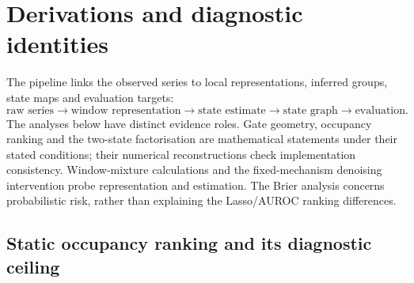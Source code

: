 \documentclass[11pt]{article}
\begin{document}
\begin{table}[!htbp]
\centering
\caption{Protocol check. The gate-stress row is deliberately given the wrong
candidate count.}
\label{tab:knownk}
\resizebox{\linewidth}{!}{}
\end{table}

\FloatBarrier
\section{Derivations and diagnostic identities}
\label{supp:derivations}

\label{sec:mechanisms}

The pipeline links the observed series to local representations, inferred
groups, state maps and evaluation targets:
\[
\text{raw series}\to\text{window representation}\to\text{state estimate}
\to\text{state graph}\to\text{evaluation}.
\]
The analyses below have distinct evidence roles. Gate geometry, occupancy
ranking and the two-state factorisation are mathematical statements under their
stated conditions; their numerical reconstructions check implementation
consistency. Window-mixture calculations and the fixed-mechanism denoising
intervention probe representation and estimation. The Brier analysis concerns
probabilistic risk, rather than explaining the Lasso/AUROC ranking differences.

\subsection{Static occupancy ranking and its diagnostic ceiling}
\label{sec:static-occupancy}
\end{document}
